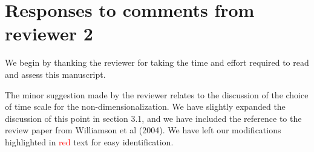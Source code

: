 \documentclass[]{article}
\begin{document}
\section*{Responses to comments from reviewer 2}

We begin by thanking the reviewer for taking the time and effort
required to read and assess this manuscript. 

The minor suggestion made by the reviewer relates to the discussion of
the choice of time scale for the non-dimensionalization. We have
slightly expanded the discussion of this point in section 3.1, and we
have included the reference to the review paper from Williamson et al
(2004). We have left our modifications highlighted in
\textcolor{red}{red} text for easy identification.
\end{document}
